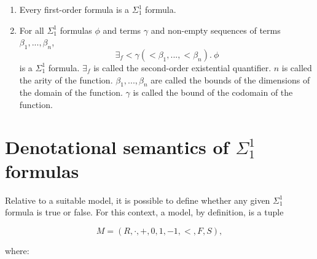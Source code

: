\documentclass[11pt]{article}
\begin{document}
\begin{enumerate}
	\item Every first-order formula is a $\Sigma^1_1$ formula.
	\item For all $\Sigma^1_1$ formulas $\phi$ and terms $\gamma$ and non-empty sequences of terms $\beta_1, ..., \beta_n$,
		\begin{equation}
			\exists_f <\gamma (<\beta_1, ..., <\beta_n).\ \phi
		\end{equation}
		is a $\Sigma^1_1$ formula. $\exists_f$ is called the second-order existential quantifier. $n$ is called the arity of the function. $\beta_1, ..., \beta_n$ are called the bounds of the dimensions of the domain of the function. $\gamma$ is called the bound of the codomain of the function.
\end{enumerate}



\section{Denotational semantics of $\Sigma^1_1$ formulas}

Relative to a suitable model, it is possible to define whether any given
$\Sigma^1_1$ formula is true or false.
For this context, a model, by definition, is a tuple

\begin{equation}
	M = (R, \cdot, +, 0, 1, -1, <, F, S),
\end{equation}

where:
\end{document}
